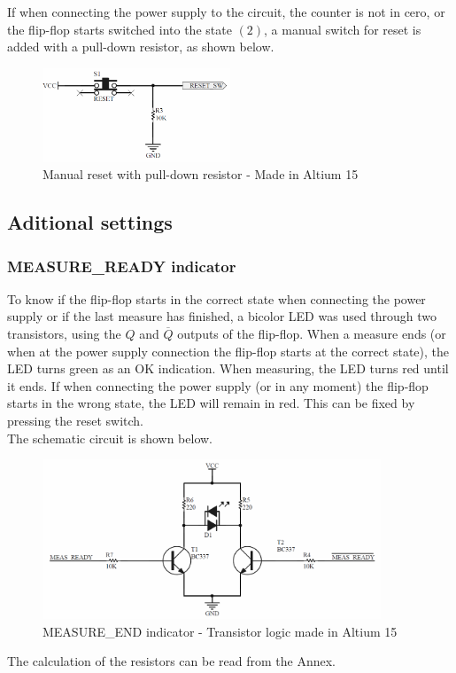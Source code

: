 If when connecting the power supply to the circuit, the counter is not in cero, or the flip-flop starts 
switched into the state $(2)$, a manual switch for reset is added with a pull-down resistor, as shown below.

\begin{figure}[H]
    \begin{centering}
    \includegraphics[width=0.5\textwidth]{data/pullDown_Switch}
    \par\end{centering}
    \caption{Manual reset with pull-down resistor - Made in Altium 15}
\end{figure}

\subsection*{Aditional settings}
\subsubsection*{MEASURE\_READY indicator}

To know if the flip-flop starts in the correct state when connecting the power supply or 
if the last measure has finished, 
a bicolor LED was used through two transistors, using the $Q$ and $\overline{Q}$ outputs 
of the flip-flop. When a measure ends (or when at the power supply connection the flip-flop starts
at the correct state), the LED turns green as an OK indication. When measuring, the LED turns red until
it ends. If when connecting the power supply (or in any moment) the flip-flop starts in the 
wrong state, the LED will remain in red. This can be fixed by pressing the reset switch.\\
The schematic circuit is shown below.

\begin{figure}[H]
    \begin{centering}
    \includegraphics[width=0.9\textwidth]{data/Transistor_LogicLED}
    \par\end{centering}
    \caption{MEASURE\_END indicator - Transistor logic made in Altium 15}
\end{figure}
The calculation of the resistors can be read from the Annex.

